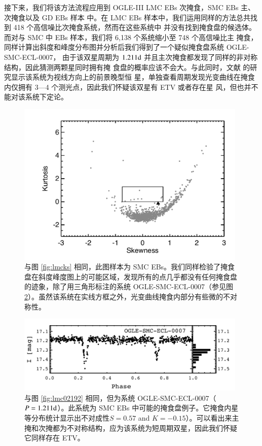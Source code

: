 接下来，我们将该方法流程应用到 OGLE-III LMC EBs 次掩食，SMC EBs 主、次掩食以及 GD EBs 样本
中。在 LMC EBs 样本中，我们运用同样的方法总共找到 418 个高信噪比次掩食系统，然而在这些系统中
并没有找到掩食盘的候选体。而对与 SMC 中 EBs 样本，我们将 6,138 个系统缩小至 748 个高信噪比主
掩食，同样计算出斜度和峰度分布图并分析后我们得到了一个疑似掩食盘系统 OGLE- SMC-ECL-0007，
由于该双星周期为 $1.211 \mathrm{d}$ 并且主次掩食都发现了同样的非对称结构，因此猜测两颗星同时拥有掩
食盘的概率应该不会大。与此同时，文献  的研究显示该系统为视线方向上的前景晚型恒
星，单独查看周期发现光变曲线在掩食内仅拥有 3---4 个测光点，因此我们怀疑该双星有 ETV 或者存在星
风，但也并不能对该系统下定论。

\begin{figure}[t]
\centering
\includegraphics[width=0.98\textwidth,trim={0.4in 0.2in 0 0}]{figures/chapter3/f11_smcks.pdf}
\caption{与图 \ref{fig:lmcks} 相同，此图样本为 SMC EBs。我们同样检验了掩食盘在斜度峰度图上的可能区域，发现所有的点几乎都没有任何掩食盘的迹象，除了用三角形标注的系统 OGLE-SMC-ECL-0007（参见图 \ref{fig:smc0007}）。虽然该系统在实线方框之外，光变曲线掩食内部分有些微的不对称性。}
\label{fig:smcks}
\end{figure}


\begin{figure}[t]
\centering
\includegraphics[width=0.98\textwidth,trim={0.0in 0.2in 0 0}]{figures/chapter3/f12_smc0007.pdf}
\caption{与图 \ref{fig:lmc02192} 相同，但为系统 OGLE-SMC-ECL-0007（$P = 1.211 \mathrm{d}$）。此系统为 SMC EBs 中可能的掩食盘例子。它掩食内星等分布统计显示出不对成性$S=0.57$ and $K=-0.15$）。可以看出来主掩和次掩都为不对称结构，应为该系统为短周期双星，因此我们怀疑它同样存在 ETV。}
\label{fig:smc0007}
\end{figure}

